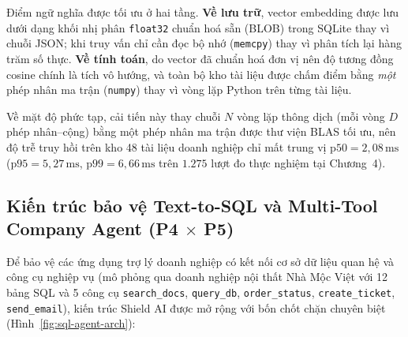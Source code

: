 Điểm ngữ nghĩa được tối ưu ở hai tầng. \textbf{Về lưu trữ}, vector embedding
được lưu dưới dạng khối nhị phân \texttt{float32} chuẩn hoá sẵn (BLOB) trong
SQLite thay vì chuỗi JSON; khi truy vấn chỉ cần đọc bộ nhớ (\texttt{memcpy})
thay vì phân tích lại hàng trăm số thực. \textbf{Về tính toán}, do vector đã
chuẩn hoá đơn vị nên độ tương đồng cosine chính là tích vô hướng, và toàn bộ
kho tài liệu được chấm điểm bằng \emph{một} phép nhân ma trận (\texttt{numpy})
thay vì vòng lặp Python trên từng tài liệu.

Về mặt độ phức tạp, cải tiến này thay chuỗi $N$ vòng lặp thông dịch (mỗi vòng
$D$ phép nhân--cộng) bằng một phép nhân ma trận được thư viện BLAS tối ưu, nên
độ trễ truy hồi trên kho 48 tài liệu doanh nghiệp chỉ mất trung vị $\text{p50} = 2{,}08\,\text{ms}$ ($\text{p95} = 5{,}27\,\text{ms}$, $\text{p99} = 6{,}66\,\text{ms}$ trên $1.275$ lượt đo thực nghiệm tại Chương~4).

\subsection{Kiến trúc bảo vệ Text-to-SQL và Multi-Tool Company Agent (P4 $\times$ P5)}

Để bảo vệ các ứng dụng trợ lý doanh nghiệp có kết nối cơ sở dữ liệu quan hệ và công cụ nghiệp vụ (mô phỏng qua doanh nghiệp nội thất Nhà Mộc Việt với 12 bảng SQL và 5 công cụ \texttt{search\_\allowbreak docs}, \texttt{query\_db}, \texttt{order\_\allowbreak status}, \texttt{create\_\allowbreak ticket}, \texttt{send\_\allowbreak email}), kiến trúc Shield AI được mở rộng với bốn chốt chặn chuyên biệt (Hình~\ref{fig:sql-agent-arch}):

